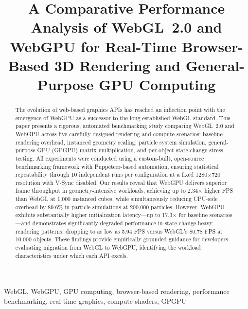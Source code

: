 \documentclass[conference]{IEEEtran}
\begin{document}
\title{A Comparative Performance Analysis of WebGL~2.0 and WebGPU for Real-Time Browser-Based 3D Rendering and General-Purpose GPU Computing}

\author{
}

\maketitle

\begin{abstract}
The evolution of web-based graphics APIs has reached an inflection point with the emergence of WebGPU as a successor to the long-established WebGL standard. This paper presents a rigorous, automated benchmarking study comparing WebGL~2.0 and WebGPU across five carefully designed rendering and compute scenarios: baseline rendering overhead, instanced geometry scaling, particle system simulation, general-purpose GPU (GPGPU) matrix multiplication, and per-object state-change stress testing. All experiments were conducted using a custom-built, open-source benchmarking framework with Puppeteer-based automation, ensuring statistical repeatability through 10 independent runs per configuration at a fixed 1280$\times$720 resolution with V-Sync disabled. Our results reveal that WebGPU delivers superior frame throughput in geometry-intensive workloads, achieving up to 2.34$\times$ higher FPS than WebGL at 1{,}000 instanced cubes, while simultaneously reducing CPU-side overhead by 89.6\% in particle simulations at 200{,}000 particles. However, WebGPU exhibits substantially higher initialization latency---up to 17.3$\times$ for baseline scenarios---and demonstrates significantly degraded performance in state-change-heavy rendering patterns, dropping to as low as 5.94 FPS versus WebGL's 80.78 FPS at 10{,}000 objects. These findings provide empirically grounded guidance for developers evaluating migration from WebGL to WebGPU, identifying the workload characteristics under which each API excels.
\end{abstract}

\begin{IEEEkeywords}
WebGL, WebGPU, GPU computing, browser-based rendering, performance benchmarking, real-time graphics, compute shaders, GPGPU
\end{IEEEkeywords}
\end{document}
